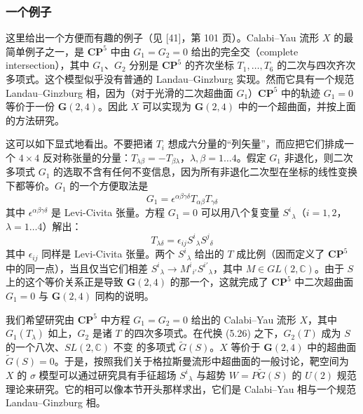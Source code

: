 \label{op:61}

\subsubsection*{一个例子}

这里给出一个方便而有趣的例子（见 [41]，第 101 页）。Calabi--Yau 流形 $X$ 的最简单例子之一，是 $\mathbf{CP}^5$ 中由 $G_1=G_2=0$ 给出的完全交（complete intersection），其中 $G_1$、$G_2$ 分别是 $\mathbf{CP}^5$ 的齐次坐标 $T_1,\ldots,T_6$ 的二次与四次齐次多项式。这个模型似乎没有普通的 Landau--Ginzburg 实现。然而它具有一个规范 Landau--Ginzburg 相，因为（对于光滑的二次超曲面 $G_1$）$\mathbf{CP}^5$ 中的轨迹 $G_1=0$ 等价于一份 $\mathbf{G}(2,4)$。因此 $X$ 可以实现为 $\mathbf{G}(2,4)$ 中的一个超曲面，并按上面的方法研究。

这可以如下显式地看出。不要把诸 $T_i$ 想成六分量的“列矢量”，而应把它们排成一个 $4\times4$ 反对称张量的分量：$T_{\lambda\beta}=-T_{\beta\lambda}$，$\lambda,\beta=1\ldots4$。假定 $G_1$ 非退化，则二次多项式 $G_1$ 的选取不含有任何不变信息，因为所有非退化二次型在坐标的线性变换下都等价。$G_1$ 的一个方便取法是
\begin{equation}\tag{5.25}
G_1=\epsilon^{\alpha\beta\gamma\delta}T_{\alpha\beta}T_{\gamma\delta}
\end{equation}
其中 $\epsilon^{\alpha\beta\gamma\delta}$ 是 Levi-Civita 张量。方程 $G_1=0$ 可以用八个复变量 $S^{i}{}_{\lambda}$（$i=1,2$，$\lambda=1\ldots4$）解出：
\begin{equation}\tag{5.26}
T_{\lambda\delta}=\epsilon_{ij}S^{i}{}_{\lambda}S^{j}{}_{\delta}
\end{equation}
其中 $\epsilon_{ij}$ 同样是 Levi-Civita 张量。两个 $S^{i}{}_{\lambda}$ 给出的 $T$ 成比例（因而定义了 $\mathbf{CP}^5$ 中的同一点），当且仅当它们相差 $S^{i}{}_{\lambda}\to M^{i}{}_{i'}S^{i'}{}_{\lambda}$，其中 $M\in GL(2,\mathbb{C})$。由于 $S$ 上的这个等价关系正是导致 $\mathbf{G}(2,4)$ 的那一个，这就完成了 $\mathbf{CP}^5$ 中二次超曲面 $G_1=0$ 与 $\mathbf{G}(2,4)$ 同构的说明。


我们希望研究由 $\mathbf{CP}^5$ 中方程 $G_1=G_2=0$ 给出的 Calabi--Yau 流形 $X$，其中 $G_1(T_\lambda)$ 如上，$G_2$ 是诸 $T$ 的四次多项式。在代换 (5.26) 之下，$G_2(T)$ 成为 $S$ 的一个八次、$SL(2,\mathbb{C})$ 不变%
\label{op:62}
的多项式 $\tilde G(S)$。$X$ 等价于 $\mathbf{G}(2,4)$ 中的超曲面 $\tilde G(S)=0$。于是，按照我们关于格拉斯曼流形中超曲面的一般讨论，靶空间为 $X$ 的 $\sigma$ 模型可以通过研究具有手征超场 $S^{i}{}_{\lambda}$ 与超势 $W=P\tilde G(S)$ 的 $U(2)$ 规范理论来研究。它的相可以像本节开头那样求出，它们是 Calabi--Yau 相与一个规范 Landau--Ginzburg 相。

